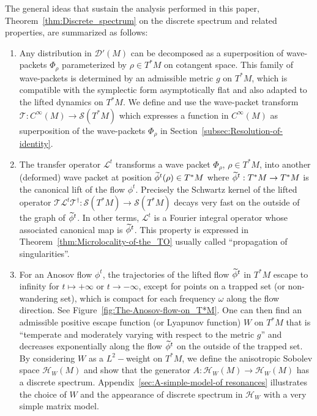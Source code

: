 \documentclass[10pt]{amsart}
\theoremstyle{definition}\newtheorem{defi}[theo]{Definition}\newtheorem{rema}[theo]{Remark}\newtheorem{exam}[theo]{Example}\newtheorem{exem}[theo]{Example}\newtheorem{nota}[theo]{Notation}
\newcommand{\clS}{\mathcal{S}}
\newcommand{\clT}{\mathcal{T}}
\newcommand{\clH}{\mathcal{H}}
\newcommand{\clL}{\mathcal{L}}
\newcommand{\clD}{\mathcal{D}}
\let\oldtilde\tilde
\renewcommand*{\tilde}[1]{\mathchoice{\widetilde{#1}}{\widetilde{#1}}{\oldtilde{#1}}{\oldtilde{#1}}}
\begin{document}
The general ideas that sustain the analysis performed in this paper, Theorem~\ref{thm:Discrete_spectrum} on the discrete spectrum and related properties, are summarized as follows:
\begin{enumerate}
\item Any distribution in $\clD'(M)$ can be decomposed as a superposition of wave-packets $\Phi_{\rho}$ parameterized by $\rho\in T^{*}M$ on cotangent space. This family of wave-packets is determined by an admissible metric $g$ on $T^{*}M$, which is compatible with the symplectic form asymptotically flat and also adapted to the lifted dynamics on $T^{*}M$. We define and use the wave-packet transform\linebreak $\clT:C^{\infty}(M)\rightarrow\clS(T^{*}M)$ which expresses a function in $C^{\infty}(M)$ as superposition of the wave-packets $\Phi_{\rho}$ in Section~\ref{subsec:Resolution-of-identity}.
\item The transfer operator $\clL^{t}$ transforms a wave packet $\Phi_{\rho}$, $\rho\in T^{*}M$, into another (deformed) wave packet at position $\tilde{\phi}^{t}(\rho)\in T^{*}M$ where $\tilde{\phi}^{t}:T^{*}M\rightarrow T^{*}M$ is the canonical lift of the flow $\phi^{t}$. Precisely the Schwartz kernel of the lifted operator $\clT\clL^{t}\clT^{\dagger}:\clS(T^{*}M)\rightarrow\clS(T^{*}M)$ decays very fast on the outside of the graph of $\tilde{\phi}^{t}$. In other terms, $\clL^{t}$ is a Fourier integral operator whose associated canonical map is $\tilde{\phi}^{t}$. This property is expressed in Theorem~\ref{thm:Microlocality-of-the_TO} usually called ``propagation of singularities''.
\item For an Anosov flow $\phi^{t}$, the trajectories of the lifted flow $\tilde{\phi}^{t}$ in $T^{*}M$ escape to infinity for $t\mapsto+\infty$ or $t\rightarrow-\infty$, except for points on a trapped set (or non-wandering set), which is compact for each frequency $\omega$ along the flow direction. See Figure~\ref{fig:The-Anosov-flow-on_T*M}. One can then find an admissible positive escape function (or Lyapunov function) $W$ on $T^{*}M$ that is ``temperate and moderately varying with respect to the metric $g$'' and decreases exponentially along the flow $\tilde{\phi}^{t}$ on the outside of the trapped set. By considering $W$ as a $L^{2}-$weight on $T^{*}M$, we define the anisotropic Sobolev space $\clH _{W}(M)$ and show that the generator $A:\clH _{W}(M)\rightarrow\clH _{W}(M)$ has a discrete spectrum. Appendix~\ref{sec:A-simple-model-of resonances} illustrates the choice of $W$ and the appearance of discrete spectrum in $\clH _{W}$ with a very simple matrix model.
\end{enumerate}
\end{document}
